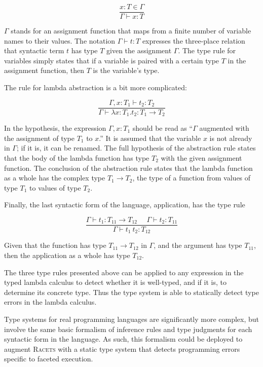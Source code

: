 \documentclass{article}
\begin{document}
\[
\frac{x : T \in \Gamma}
{\Gamma \vdash x : T}
\]

$\Gamma$ stands for an assignment function that maps from a finite number of variable names to their values. The notation $\Gamma \vdash t : T$ expresses the three-place relation that syntactic term $t$ has type $T$ given the assignment $\Gamma$. The type rule for variables simply states that if a variable is paired with a certain type $T$ in the assignment function, then $T$ is the variable's type.

The rule for lambda abstraction is a bit more complicated:

\[
\frac{\Gamma, x : T_1 \vdash t_2 : T_2}
{\Gamma \vdash \lambda x : T_1 . t_2 : T_1 \to T_2}
\]

In the hypothesis, the expression $\Gamma, x : T_1$ should be read as ``$\Gamma$ augmented with the assignment of type $T_1$ to $x$.'' It is assumed that the variable $x$ is not already in $\Gamma$; if it is, it can be renamed. The full hypothesis of the abstraction rule states that the body of the lambda function has type $T_2$ with the given assignment function. The conclusion of the abstraction rule states that the lambda function as a whole has the complex type $T_1 \to T_2$, the type of a function from values of type $T_1$ to values of type $T_2$.

Finally, the last syntactic form of the language, application, has the type rule

\[
\frac{\Gamma \vdash t_1 : T_{11} \to T_{12}\ \ \ \ \ \ \Gamma \vdash t_2 : T_{11}}
{\Gamma \vdash t_1\ t_2 : T_{12}}
\]

Given that the function has type $T_{11} \to T_{12}$ in $\Gamma$, and the argument has type $T_{11}$, then the application as a whole has type $T_{12}$.

The three type rules presented above can be applied to any expression in the typed lambda calculus to detect whether it is well-typed, and if it is, to determine its concrete type. Thus the type system is able to statically detect type errors in the lambda calculus.

Type systems for real programming languages are significantly more complex, but involve the same basic formalism of inference rules and type judgments for each syntactic form in the language. As such, this formalism could be deployed to augment \textsc{Racets} with a static type system that detects programming errors specific to faceted execution.
\end{document}
